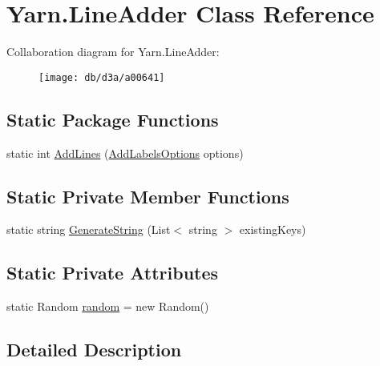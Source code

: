 \hypertarget{a00102}{\section{Yarn.\-Line\-Adder Class Reference}
\label{a00102}
}


Collaboration diagram for Yarn.\-Line\-Adder\-:
\nopagebreak
\begin{figure}[H]
\begin{center}
\leavevmode
\texttt{[image: db/d3a/a00641]}
\end{center}
\end{figure}
\subsection*{Static Package Functions}
\begin{DoxyCompactItemize}
\item 
static int \hyperlink{a00102_aa2b8af349e709b8a45d42af5146ca848}{Add\-Lines} (\hyperlink{a00017}{Add\-Labels\-Options} options)
\end{DoxyCompactItemize}
\subsection*{Static Private Member Functions}
\begin{DoxyCompactItemize}
\item 
static string \hyperlink{a00102_a91ad68b679bd3b0bd89fe92ea5068688}{Generate\-String} (List$<$ string $>$ existing\-Keys)
\end{DoxyCompactItemize}
\subsection*{Static Private Attributes}
\begin{DoxyCompactItemize}
\item 
static Random \hyperlink{a00102_ad887744b1b813fc081be814958742c37}{random} = new Random()
\end{DoxyCompactItemize}


\subsection{Detailed Description}


